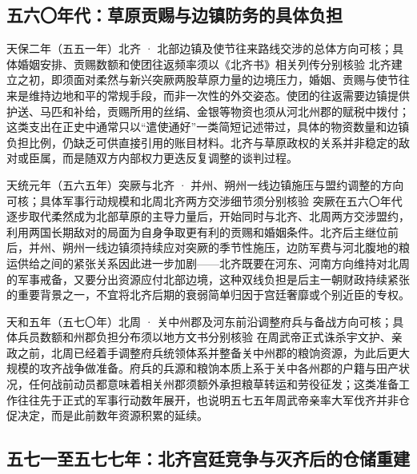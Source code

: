 \subsection{五六〇年代：草原贡赐与边镇防务的具体负担}

\begin{event}{}{天保二年（五五一年）}{北齐 · 北部边镇及使节往来路线}{交涉的总体方向可核；具体婚姻安排、贡赐数额和使团往返频率须以《北齐书》相关列传分别核验}
北齐建立之初，即须面对柔然与新兴突厥两股草原力量的边境压力，婚姻、贡赐与使节往来是维持边地和平的常规手段，而非一次性的外交姿态。使团的往返需要边镇提供护送、马匹和补给，贡赐所用的丝绢、金银等物资也须从河北州郡的赋税中拨付；这类支出在正史中通常只以“遣使通好”一类简短记述带过，具体的物资数量和边镇负担比例，仍缺乏可供直接引用的账目材料。北齐与草原政权的关系并非稳定的敌对或臣属，而是随双方内部权力更迭反复调整的谈判过程。
\end{event}

\begin{event}{}{天统元年（五六五年）}{突厥与北齐 · 并州、朔州一线边镇}{施压与盟约调整的方向可核；具体军事行动规模和北周北齐两方交涉细节须分别核验}
突厥在五六〇年代逐步取代柔然成为北部草原的主导力量后，开始同时与北齐、北周两方交涉盟约，利用两国长期敌对的局面为自身争取更有利的贡赐和婚姻条件。北齐后主继位前后，并州、朔州一线边镇须持续应对突厥的季节性施压，边防军费与河北腹地的粮运供给之间的紧张关系因此进一步加剧——北齐既要在河东、河南方向维持对北周的军事戒备，又要分出资源应付北部边境，这种双线负担是后主一朝财政持续紧张的重要背景之一，不宜将北齐后期的衰弱简单归因于宫廷奢靡或个别近臣的专权。
\end{event}

\begin{event}{}{天和五年（五七〇年）}{北周 · 关中州郡及河东前沿}{调整府兵与备战方向可核；具体兵员数额和州郡负担分布须以地方文书分别核验}
在周武帝正式诛杀宇文护、亲政之前，北周已经着手调整府兵统领体系并整备关中州郡的粮饷资源，为此后更大规模的攻齐战争做准备。府兵的兵源和粮饷本质上系于关中各州郡的户籍与田产状况，任何战前动员都意味着相关州郡须额外承担粮草转运和劳役征发；这类准备工作往往先于正式的军事行动数年展开，也说明五七五年周武帝亲率大军伐齐并非仓促决定，而是此前数年资源积累的延续。
\end{event}

\subsection{五七一至五七七年：北齐宫廷竞争与灭齐后的仓储重建}


